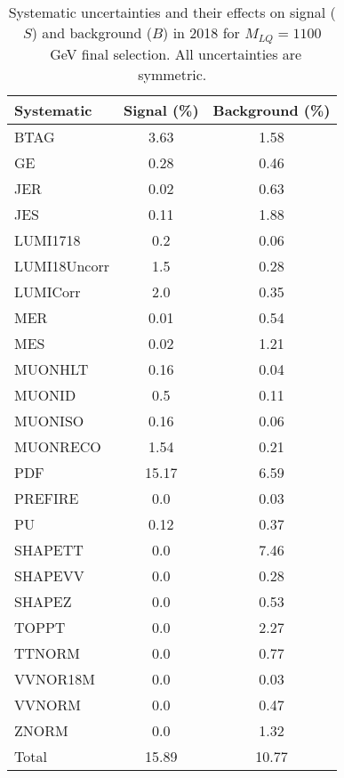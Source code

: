 \begin{table}[htbp]
\begin{center}
\caption{Systematic uncertainties and their effects on signal ($S$) and background ($B$) in 2018 for $M_{LQ}=1100$~GeV final selection. All uncertainties are symmetric.}
\begin{tabular}{lcc}
\hline\hline
Systematic & Signal (\%) & Background (\%) \\ \hline 
BTAG & 3.63 & 1.58\\ 
GE & 0.28 & 0.46\\ 
JER & 0.02 & 0.63\\ 
JES & 0.11 & 1.88\\ 
LUMI1718 & 0.2 & 0.06\\ 
LUMI18Uncorr & 1.5 & 0.28\\ 
LUMICorr & 2.0 & 0.35\\ 
MER & 0.01 & 0.54\\ 
MES & 0.02 & 1.21\\ 
MUONHLT & 0.16 & 0.04\\ 
MUONID & 0.5 & 0.11\\ 
MUONISO & 0.16 & 0.06\\ 
MUONRECO & 1.54 & 0.21\\ 
PDF & 15.17 & 6.59\\ 
PREFIRE & 0.0 & 0.03\\ 
PU & 0.12 & 0.37\\ 
SHAPETT & 0.0 & 7.46\\ 
SHAPEVV & 0.0 & 0.28\\ 
SHAPEZ & 0.0 & 0.53\\ 
TOPPT & 0.0 & 2.27\\ 
TTNORM & 0.0 & 0.77\\ 
VVNOR18M & 0.0 & 0.03\\ 
VVNORM & 0.0 & 0.47\\ 
ZNORM & 0.0 & 1.32\\ 
Total & 15.89 & 10.77\\ \hline \hline
\end{tabular}
\label{tab:SysUncertainties_uujj_1100}
\end{center}
\end{table}

